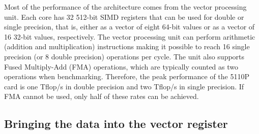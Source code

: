 \documentclass{sig-alternate}
\def\ger#1{#1}
\begin{document}
Most of the performance of the architecture comes from the vector
processing unit. Each core has 32 512-bit SIMD registers that can be
used for double or single precision, that is, either as a vector of eight
64-bit values or as a vector of 16 32-bit values, respectively. 
\ger{The vector processing unit can perform arithmetic (addition and multiplication) 
instructions making it possible to reach 16 single precision 
(or 8 double precision) operations per cycle. 
The unit also supports Fused Multiply-Add (FMA)
operations, which are typically counted as two operations 
when benchmarking. Therefore, the peak performance of the 5110P
card is one Tflop/s in double precision and two Tflop/s in single
precision. If FMA cannot be used, only half of these rates can be
achieved.}



\subsection{Bringing the data into the vector register}
\end{document}
